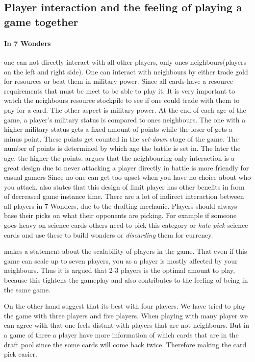\documentclass[a4paper]{article}
\begin{document}
\subsection{Player interaction and the feeling of playing a game together}
\paragraph{In 7 Wonders} one can not directly interact with all other players, only ones neighbours(players on the left and right side).
One can interact with neighbours by either trade gold for resources or beat them in military power.
Since all cards have a resource requirements that must be meet to be able to play it.
It is very important to watch the neighbours resource stockpile to see if one could trade with them to pay for a card.
The other aspect is military power.
At the end of each age of the game, a player's military status is compared to ones neighbours.
The one with a higher military status gets a fixed amount of points while the loser of gets a minus point.
These points get counted in the \textit{set-down} stage of the game. The number of points is determined by which age the battle is set in.
The later the age, the higher the points. 
 argues that the neighbouring only interaction is a great design due to never attacking a player directly in battle is more friendly for casual gamers Since no one can get too upset when you have no choice about who you attack. \citeauthor{notsacgame7wond} also states that this design of limit player has other benefits in form of decreased game instance time.
There are a lot of indirect interaction between all players in 7 Wonders, due to the drafting mechanic. Players should always base their picks on what their opponents are picking.
For example if someone goes heavy on science cards others need to pick this category or \textit{hate-pick} science cards and use these to build wonders or \textit{discarding} them for currency.

 makes a statement about the scalability of players in the game.
That even if this game can scale up to seven players, you as a player is mostly affected by your neighbours.
Thus it is argued that 2-3 players is the optimal amount to play, because this tightens the gameplay and also contributes to the feeling of being in the same game.

On the other hand  suggest that its best with four players.
We have tried to play the game with three players and five players.
When playing with many player we can agree with \citeauthor{critical7wond} that one feels distant with players that are not neighbours.
But in a game of three a player have more information of which cards that are in the draft pool since the some cards will come back twice. Therefore making the card pick easier. 
\end{document}
